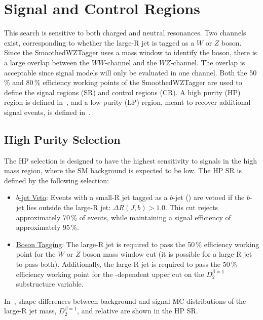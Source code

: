 \section{Signal and Control Regions}
\label{ch:eventSelection:srcr}
This search is sensitive to both charged and neutral resonances. Two channels exist, corresponding to whether the large-R jet is tagged as a $W$ or $Z$ boson. Since the SmoothedWZTagger uses a mass window to identify the boson, there is a large overlap between the $WW$-channel and the $WZ$-channel. The overlap is acceptable since signal models will only be evaluated in one channel. Both the 50\,\% and 80\,\% efficiency working points of the SmoothedWZTagger are used to define the signal regions (SR) and control regions (CR). A high purity (HP) region is defined in~\Sect{\ref{ch:evt_sel:hp}}, and a low purity (LP) region, meant to recover additional signal events, is defined in~\Sect{\ref{ch:evt_sel:lp}}.

%
\subsection{High Purity Selection}
\label{ch:evt_sel:hp}
The HP selection is designed to have the highest sensitivity to signals in the high mass region, where the SM background is expected to be low. The HP SR is defined by the following selection:
\begin{itemize}
\item\underline{$b$-jet Veto}: Events with a small-R jet tagged as a $b$-jet (\Sect{\ref{ch:objectReconstruction:smallr}}) are vetoed if the $b$-jet lies outside the large-R jet: $\Delta R(J,b)>1.0$. This cut rejects approximately 70\,\% of \ttbar events, while maintaining a signal efficiency of approximately 95\,\%.
\item\underline{Boson Tagging}: The large-R jet is required to pass the 50\,\% efficiency working point for the $W$ or $Z$ boson mass window cut (it is possible for a large-R jet to pass both). Additionally, the large-R jet is required to pass the 50\,\% efficiency working point for the \pT-dependent upper cut on the $D_2^{\beta=1}$ substructure variable. 
\end{itemize}
In~\Fig{\ref{fig:evt_sigbkg_hp}}, shape differences between background and signal MC distributions of the large-R jet mass, $D_2^{\beta=1}$, and relative \pT are shown in the HP SR.

